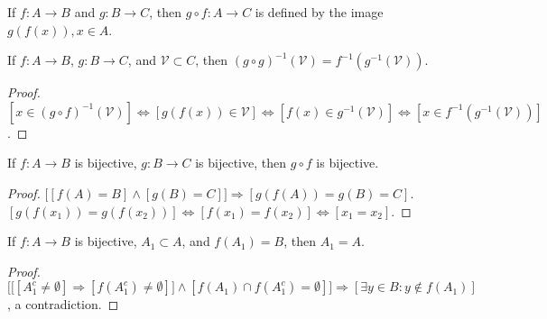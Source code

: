     \begin{definition}
    If $f:A\rightarrow B$ and $g:B\rightarrow C$, then $g\circ f:A\rightarrow C$ is defined by the image $g(f(x)), x\in A$. 
    \end{definition}
    \begin{theorem}
    If $f:A\rightarrow B$, $g:B\rightarrow C$, and $\mathcal{V}\subset C$, then $(g\circ g)^{-1}(\mathcal{V}) = f^{-1}(g^{-1}(\mathcal{V}))$.
    \end{theorem}
    \begin{proof}
    $[x\in (g\circ f)^{-1}(\mathcal{V})]\Leftrightarrow [g(f(x))\in \mathcal{V}] \Leftrightarrow [f(x)\in g^{-1}(\mathcal{V})]\Leftrightarrow [x\in f^{-1}(g^{-1}(\mathcal{V}))]$.
    \end{proof}
    \begin{theorem}
    If $f:A\rightarrow B$ is bijective, $g:B\rightarrow C$ is bijective, then $g\circ f$ is bijective.
    \end{theorem}
    \begin{proof}
    $\big[[f(A) = B]\land [g(B) = C]\big]\Rightarrow [g(f(A)) = g(B) = C]$. $[g(f(x_1))=g(f(x_2))]\Leftrightarrow [f(x_1)=f(x_2)]\Leftrightarrow [x_1=x_2]$.
    \end{proof}
    \begin{theorem}
    If $f:A\rightarrow B$ is bijective, $A_1\subset A$, and $f(A_1) = B$, then $A_1=A$.
    \end{theorem}
    \begin{proof}
    $\Big[\big[[A_1^c \ne \emptyset]\Rightarrow [f(A_1^c) \ne \emptyset]\big]\land[f(A_1)\cap f(A_1^c) = \emptyset]\Big]\Rightarrow [\exists y\in B:y\notin f(A_1)]$, a contradiction.
    \end{proof}